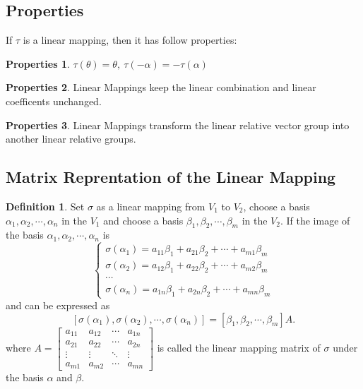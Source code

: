 \documentclass{article}
\theoremstyle{definition}
\newtheorem{defi}{Definition}[section]
\newtheorem{pro}{Properties}[section]
\begin{document}
\subsection{Properties}
If $\tau$ is a linear mapping, then it has follow properties:
\begin{pro}
    $\tau (\theta) = \theta,\ \tau(-\alpha)=-\tau(\alpha)$
\end{pro}
\begin{pro}
    Linear Mappings keep the linear combination and linear coefficents unchanged.
\end{pro}
\begin{pro}
    Linear Mappings transform the linear relative vector group into 
    another linear relative groups.
\end{pro}

\subsection{Matrix Reprentation of the Linear Mapping}
\begin{defi}
Set $\sigma$ as a linear mapping from $V_{1}$ to $V_{2}$, 
choose a basis $\alpha_{1},\alpha_{2},\cdots,\alpha_{n}$ in the $V_{1}$
and choose a basis $\beta_{1},\beta_{2},\cdots,\beta_{m}$ in the $V_{2}$.
If the image of the basis $\alpha_{1},\alpha_{2},\cdots,\alpha_{n}$ is
$$\begin{cases}
    \sigma(\alpha_{1})=a_{11}\beta_{1}+a_{21}\beta_{2}+\cdots+a_{m1}\beta_{m}\\
    \sigma(\alpha_{2})=a_{12}\beta_{1}+a_{22}\beta_{2}+\cdots+a_{m2}\beta_{m}\\
    \cdots\\
    \sigma(\alpha_{n})=a_{1n}\beta_{1}+a_{2n}\beta_{2}+\cdots+a_{mn}\beta_{m}
\end{cases}$$ 
and can be expressed as 
$$[\sigma(\alpha_{1}),\sigma(\alpha_{2}),\cdots,\sigma(\alpha_{n})]
=[\beta_{1},\beta_{2},\cdots,\beta_{m}]A.$$
where 
$A
=
\begin{bmatrix}
    a_{11}&a_{12}&\cdots&a_{1n}\\
    a_{21}&a_{22}&\cdots&a_{2n}\\
    \vdots&\vdots&\ddots&\vdots\\
    a_{m1}&a_{m2}&\cdots&a_{mn}
\end{bmatrix}$
 is called the linear mapping matrix of $\sigma$ under 
 the basis $\alpha$ and $\beta$.
\end{defi}
\end{document}
